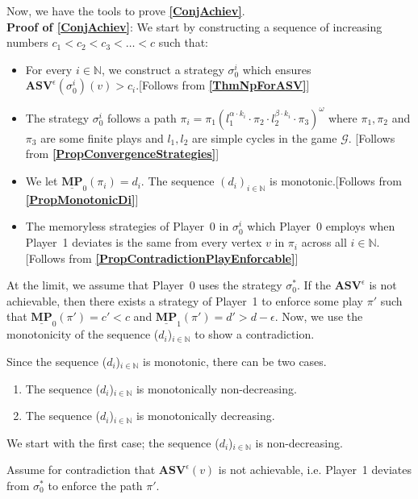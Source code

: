 Now, we have the tools to prove \textbf{\cref{ConjAchiev}}. \\
\noindent \textbf{Proof of \cref{ConjAchiev}}: We start by constructing a sequence of increasing numbers $c_1 < c_2 < c_3 < \dotsc < c$ such that:
\begin{itemize}
    \item For every $i \in \mathbb{N}$, we construct a strategy $\sigma_0^i$ which ensures $\mathbf{ASV}^{\epsilon}(\sigma_0^i)(v) > c_i$.[Follows from \textbf{\cref{ThmNpForASV}}]
    \item The strategy $\sigma_0^i$ follows a path $\pi_i = \pi_{1}(l^{\alpha \cdot k_i}_{1} \cdot \pi_{2} \cdot l^{\beta \cdot k_i}_{2} \cdot \pi_{3})^{\omega}$ where $\pi_1, \pi_2$ and $\pi_3$ are some finite plays and $l_1, l_2$ are simple cycles in the game $\mathcal{G}$. [Follows from \textbf{\cref{PropConvergenceStrategies}}]
    \item We let $\underline{\mathbf{MP}}_0(\pi_i) = d_i$. The sequence $(d_i)_{i\in \mathbb{N}}$ is monotonic.[Follows from \textbf{\cref{PropMonotonicDi}}]
    \item The memoryless strategies of Player~0 in $\sigma_0^i$ which Player~0 employs when Player~1 deviates is the same from every vertex $v$ in $\pi_i$ across all $i \in \mathbb{N}$.[Follows from \textbf{\cref{PropContradictionPlayEnforcable}}]
\end{itemize}

At the limit, we assume that Player~0 uses the strategy $\sigma_0^*$. If the $\mathbf{ASV}^{\epsilon}$ is not achievable, then there exists a strategy of Player~1 to enforce some play $\pi'$ such that $\underline{\mathbf{MP}}_0(\pi') = c' < c$ and $\underline{\mathbf{MP}}_1(\pi') = d' > d - \epsilon$. Now, we use the monotonicity of the sequence ($d_i$)$_{i \in \mathbb{N}}$ to show a contradiction. 

Since the sequence ($d_i$)$_{i \in \mathbb{N}}$ is monotonic, there can be two cases.
\begin{enumerate}
    \item The sequence ($d_i$)$_{i \in \mathbb{N}}$ is monotonically non-decreasing.
    \item The sequence ($d_i$)$_{i \in \mathbb{N}}$ is monotonically decreasing.
\end{enumerate}

We start with the first case; the sequence ($d_i$)$_{i \in \mathbb{N}}$ is non-decreasing.

Assume for contradiction that $\mathbf{ASV}^{\epsilon}(v)$ is not achievable, i.e. Player~1 deviates from $\sigma_0^*$ to enforce the path $\pi'$. 

